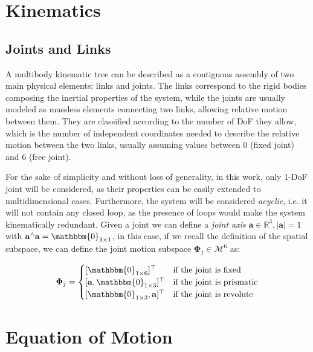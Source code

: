 \section{Kinematics}

\subsection{Joints and Links}

A multibody kinematic tree can be described as a contiguous assembly of two main physical elements: links and joints. The links correspond to the rigid bodies composing the inertial properties of the system, while the joints are usually modeled as massless elements connecting two links, allowing relative motion between them. They are classified according to the number of \ac{DoF} they allow, which is the number of independent coordinates needed to describe the relative motion between the two links, usually assuming values between 0 (fixed joint) and 6 (free joint).

For the sake of simplicity and without loss of generality, in this work, only 1-\ac{DoF} joint will be considered, as their properties can be easily extended to multidimensional cases. Furthermore, the system will be considered \textit{acyclic}, i.e. it will not contain any closed loop, as the presence of loops would make the system kinematically redundant.
Given a joint we can define a \textit{joint axis} $\mathbf{a} \in \mathbb{R}^3, |\mathbf{a}| = 1$ with $\mathbf{a}^\wedge \mathbf{a} = \mathbbm{0}_{3 \times 1}$, in this case, if we recall the definition of the spatial subspace, we can define the joint motion subspace $\boldsymbol{\Phi} _j \in \mathcal{M} ^6$ as:

\begin{equation}
    \boldsymbol{\Phi} _j =
    \begin{cases}
        [\mathbbm{0}_{1 \times 6}] ^\top             & \text{if the joint is fixed}     \\
        [\mathbf{a}, \mathbbm{0}_{1 \times 3}] ^\top & \text{if the joint is prismatic} \\
        [\mathbbm{0}_{1 \times 3}, \mathbf{a}] ^\top & \text{if the joint is revolute}
    \end{cases}
\end{equation}

\section{Equation of Motion}
\label{sec:back_eom}

